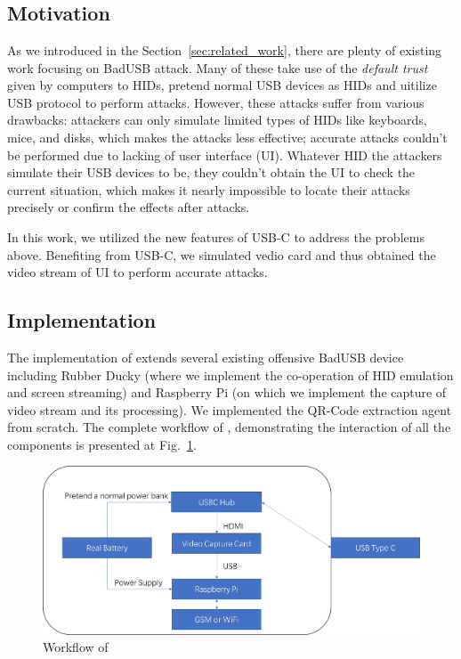 \section{\tool}

\subsection{Motivation}
As we introduced in the Section~\ref{sec:related_work}, there are plenty of existing work  focusing on BadUSB attack. 
Many of these take use of the \textit{default trust} given by computers to HIDs, pretend normal USB devices as HIDs and uitilize USB protocol to perform attacks. 
However, these attacks suffer from various drawbacks:
 attackers can only simulate limited types of HIDs like keyboards, mice, and disks, which makes the attacks less effective;
 accurate attacks couldn't be performed due to lacking of user interface (UI).
Whatever HID the attackers simulate their USB devices to be, they couldn't obtain the UI to check the current situation, which makes it nearly impossible to locate their attacks precisely or confirm the effects after attacks.

In this work, we utilized the new features of USB-C to address the problems above.
Benefiting from USB-C, we simulated vedio card and thus obtained the video stream of UI to perform accurate attacks.

\subsection{Implementation}
The implementation of \tool extends several existing offensive BadUSB device including Rubber Ducky (where we implement the co-operation of HID emulation and screen streaming) and Raspberry Pi (on which we implement the capture of video stream and its processing). We implemented the QR-Code extraction agent from scratch. The complete workflow of \tool, demonstrating the interaction of all the components is presented at Fig.~\ref{fig:workflow}.

\begin{figure}[htbp]
\includegraphics[width=\linewidth]{./Figs/workflow.png}
\caption{Workflow of \tool}
\label{fig:workflow}
\end{figure}


